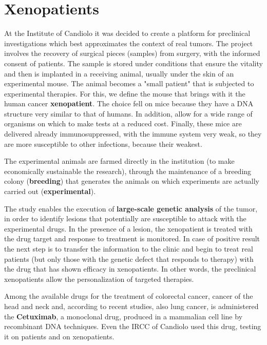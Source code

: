 \section{Xenopatients}\label{sez:xp}

At the Institute of Candiolo it was decided to create a platform for preclinical investigations which best approximates the context of real tumors. The project involves the recovery of surgical pieces (samples) from surgery, with the informed consent of patients. The sample is stored under conditions that ensure the vitality and then is implanted in a receiving animal, usually under the skin of an experimental mouse. The animal becomes a "small patient" that is subjected to experimental therapies. For this, we define the mouse that brings with it the human cancer \textbf{xenopatient}. The choice fell on mice because they have a DNA structure very similar to that of humans. In addition, allow for a wide range of organisms on which to make tests at a reduced cost. Finally, these mice are delivered already immunosuppressed, with the immune system very weak, so they are more susceptible to other infections, because their weakest.

The experimental animals are farmed directly in the institution (to make economically sustainable the research), through the maintenance of a breeding colony (\textbf{breeding}) that generates the animals on which experiments are actually carried out (\textbf{experimental}).

The study enables the execution of \textbf{large-scale genetic analysis} of the tumor, in order to identify lesions that potentially are susceptible to attack with the experimental drugs. In the presence of a lesion, the xenopatient is treated with the drug target and response to treatment is monitored. In case of positive result the next step is to transfer the information to the clinic and begin to treat real patients (but only those with the genetic defect that responds to therapy) with the drug that has shown efficacy in xenopatients. In other words, the preclinical xenopatients allow the personalization of targeted therapies.

Among the available drugs for the treatment of colorectal cancer, cancer of the head and neck and, according to recent studies, also lung cancer, is administered the \textbf{Cetuximab}, a monoclonal drug, produced in a mammalian cell line by recombinant DNA techniques. Even the IRCC of Candiolo used this drug, testing it on patients and on xenopatients.


